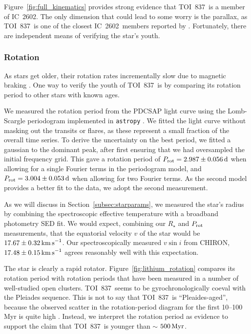 \documentclass[12pt,twocolumn,tighten]{aastex63}
\newcommand{\tn}{TOI~837} %
\newcommand{\cn}{IC~2602} %
\begin{document}
Figure~\ref{fig:full_kinematics} provides strong evidence that \tn\ is
a member of \cn.  The only dimension that could lead to some worry is
the parallax, as \tn\ is one of the closest \cn\ members reported by
\citet{cantatgaudin_gaia_2018}.  Fortunately, there are independent
means of verifying the star's youth.

\subsubsection{Rotation}

As stars get older, their rotation rates incrementally slow due to
magnetic braking \cite{weber_angular_1967,skumanich_time_1972}.  One
way to verify the youth of \tn\ is by comparing its rotation period to
other stars with known ages.

We measured the rotation period from the PDCSAP light curve using the
Lomb-Scargle periodogram implemented in \texttt{astropy}
\citep{lomb_1976,scargle_studies_1982,vanderplas_periodograms_2015}.
We fitted the light curve without masking out the transits or flares,
as these represent a small fraction of the overall time series.  To
derive the uncertainty on the best period, we fitted a gaussian to the
dominant peak, after first ensuring that we had oversampled the
initial frequency grid.  This gave a rotation period of $P_{\rm rot} =
2.987 \pm 0.056\,{\rm d}$ when allowing for a single Fourier terms in
the periodogram model, and $P_{\rm rot} = 3.004 \pm 0.053\,{\rm d}$
when allowing for two Fourier terms.  As the second model provides a
better fit to the data, we adopt the second measurement.

As we will discuss in Section~\ref{subsec:starparams}, we measured the
star's radius by combining the spectroscopic effective temperature
with a broadband photometry SED fit.  We would expect, combining our
$R_\star$ and $P_{\rm rot}$ measurements, that the equatorial velocity
$v$ of the star would be $17.67 \pm 0.32 \,{\rm km\,s}^{-1}$.  Our
spectroscopically measured $v\sin i$ from CHIRON, $17.48 \pm 0.15
\,{\rm km\,s}^{-1}$ agrees reasonably well with this expectation.

The star is clearly a rapid rotator.
Figure~\ref{fig:lithium_rotation} compares its rotation period with
rotation periods that have been measured in a number of well-studied
open clusters.  \tn\ seems to be gyrochronologically coeval with the
Pleiades sequence.  This is not to say that \tn\ is ``Pleaides-aged'',
because the observed scatter in the rotation-period diagram for the
first 10--100$\,$Myr is quite high \citep[see Figure~9
of][]{rebull_rotation_2020}.  Instead, we interpret the rotation
period as evidence to support the claim that \tn\ is younger than $\sim$
$500\,{\rm Myr}$.
\end{document}
